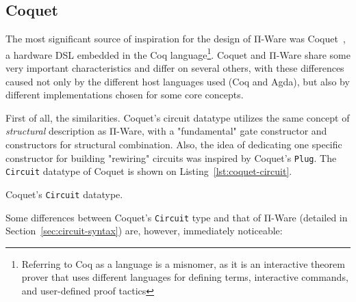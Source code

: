         \subsection{Coquet}
        \label{subsec:coquet}
            The most significant source of inspiration for the design of Π-Ware was
            Coquet~\cite{coquet2011}, a hardware \ac{DSL} embedded in the Coq
            language\footnote{Referring to Coq as a language is a misnomer, as it is
                an interactive theorem prover that uses different languages for defining terms,
                interactive commands, and user-defined proof tactics}.
            Coquet and Π-Ware share some very important characteristics and differ on several others,
            with these differences caused not only by the different host languages used (Coq and Agda),
            but also by different implementations chosen for some core concepts.

            First of all, the similarities.
            Coquet's circuit datatype utilizes the same concept of \emph{structural} description
            as Π-Ware, with a "fundamental" gate constructor and constructors for structural combination.
            Also, the idea of dedicating one specific constructor for building "rewiring" circuits
            was inspired by Coquet's \texttt{Plug}.
            The \texttt{Circuit} datatype of Coquet is shown on Listing~\ref{lst:coquet-circuit}.

            \begin{listing}[h]
                \caption{Coquet's \texttt{Circuit} datatype.\label{lst:coquet-circuit}}
            \end{listing}

            Some differences between Coquet's \texttt{Circuit} type and that of Π-Ware
            (detailed in Section~\ref{sec:circuit-syntax}) are, however, immediately noticeable:

